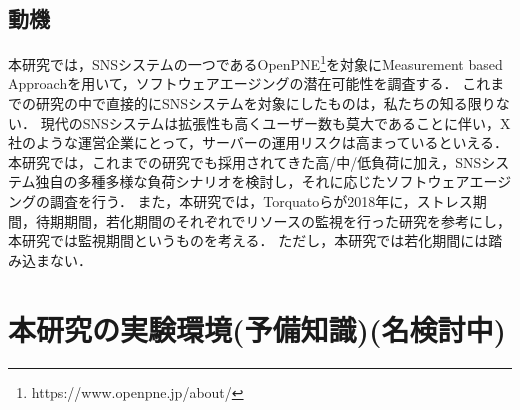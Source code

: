 \documentclass[twoside,twocolumn,10pt]{jarticle}  %
\begin{document}
\subsection{動機}
本研究では，SNSシステムの一つであるOpenPNE\footnote{https://www.openpne.jp/about/}を対象にMeasurement based Approachを用いて，ソフトウェアエージングの潜在可能性を調査する．
これまでの研究の中で直接的にSNSシステムを対象にしたものは，私たちの知る限りない．
現代のSNSシステムは拡張性も高くユーザー数も莫大であることに伴い，X社のような運営企業にとって，サーバーの運用リスクは高まっているといえる．
本研究では，これまでの研究でも採用されてきた高/中/低負荷に加え，SNSシステム独自の多種多様な負荷シナリオを検討し，それに応じたソフトウェアエージングの調査を行う．
また，本研究では，Torquatoら\cite{Torquato2018SWAREa}が2018年に，ストレス期間，待期期間，若化期間のそれぞれでリソースの監視を行った研究を参考にし，本研究では監視期間というものを考える．
ただし，本研究では若化期間には踏み込まない．

\section{本研究の実験環境(予備知識)(名検討中)}
\label{preparing}
\end{document}
